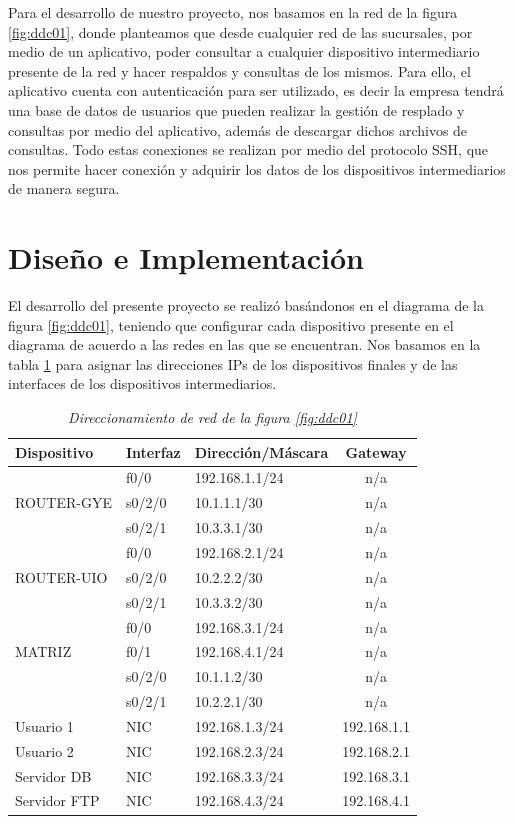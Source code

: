 \documentclass[conference]{IEEEtran}
\begin{document}
Para el desarrollo de nuestro proyecto, nos basamos en la red de la figura \ref{fig:ddc01}, donde planteamos que desde cualquier red de las sucursales, por medio de un aplicativo, poder consultar a cualquier dispositivo intermediario presente de la red y hacer respaldos y consultas de los mismos. Para ello, el aplicativo cuenta con autenticación para ser utilizado, es decir la empresa tendrá una base de datos de usuarios que pueden realizar la gestión de resplado y consultas por medio del aplicativo, además de descargar dichos archivos de consultas. Todo estas conexiones se realizan por medio del protocolo SSH, que nos permite hacer conexión y adquirir los datos de los dispositivos intermediarios de manera segura.

\section{Diseño e Implementación}
El desarrollo del presente proyecto se realizó basándonos en el diagrama de la figura \ref{fig:ddc01}, teniendo que configurar cada dispositivo presente en el diagrama de acuerdo a las redes en las que se encuentran. Nos basamos en la tabla \ref{tab:dir01} para asignar las direcciones IPs de los dispositivos finales y de las interfaces de los dispositivos intermediarios. \\
\begin{table}[h]
\begin{center}
	\begin{tabular}{|l|l|l|c|}
	\hline
	\textbf{Dispositivo} &\textbf{Interfaz} &\textbf{Dirección/Máscara} &\textbf{ Gateway }\\ \hline
	\multirow{3}{*}{ROUTER-GYE}& f0/0 & 192.168.1.1/24 & n/a\\ \cline{2-4}
	&s0/2/0  &10.1.1.1/30 & n/a \\ \cline{2-4}
	&s0/2/1 &10.3.3.1/30 & n/a\\ \hline
	\multirow{3}{*}{ROUTER-UIO}& f0/0 & 192.168.2.1/24 & n/a\\ \cline{2-4}
	&s0/2/0  &10.2.2.2/30 & n/a \\ \cline{2-4}
	&s0/2/1 &10.3.3.2/30 & n/a\\ \hline
	\multirow{3}{*}{MATRIZ}& f0/0 & 192.168.3.1/24 & n/a\\ \cline{2-4}
	& f0/1 & 192.168.4.1/24 & n/a\\ \cline{2-4}
	&s0/2/0  &10.1.1.2/30 & n/a \\ \cline{2-4}
	&s0/2/1 &10.2.2.1/30 & n/a\\ \hline
	Usuario 1 & NIC & 192.168.1.3/24 &192.168.1.1 \\\hline
	Usuario 2 & NIC & 192.168.2.3/24 &192.168.2.1 \\\hline
	Servidor DB & NIC & 192.168.3.3/24 &192.168.3.1 \\\hline
	Servidor FTP & NIC & 192.168.4.3/24 &192.168.4.1 \\\hline
\end{tabular}\vspace{0.25cm}
\caption{\textit{Direccionamiento de red de la figura \ref{fig:ddc01}}}
\label{tab:dir01}
\end{center}
\end{table}\\
\end{document}
